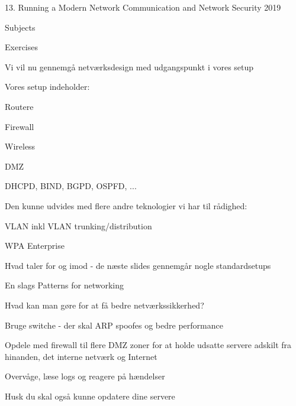 \documentclass[Screen16to9,17pt]{foils}
\begin{document}
\mytitlepage
{13. Running a Modern Network}
{Communication and Network Security 2019}



\begin{list1}
\item Subjects
\begin{list2}
\item
\end{list2}
\item Exercises
\begin{list2}
\item
\end{list2}
\end{list1}


\begin{list1}
\item Vi vil nu gennemgå netværksdesign med udgangspunkt i vores setup
\item Vores setup indeholder:
\begin{list2}
\item Routere
\item Firewall
\item Wireless
\item DMZ
\item DHCPD, BIND, BGPD, OSPFD, ...
\end{list2}
\item Den kunne udvides med flere andre teknologier vi har til rådighed:
\begin{list2}
\item VLAN inkl VLAN trunking/distribution
\item WPA Enterprise
\end{list2}
\item Hvad taler for og imod - de næste slides gennemgår nogle standardsetups
\item En slags Patterns for networking
\end{list1}






\begin{list1}
\item Hvad kan man gøre for at få bedre netværkssikkerhed?
\begin{list2}
\item Bruge switche - der skal ARP spoofes og bedre performance
\item Opdele med firewall til flere DMZ zoner for at holde
      udsatte servere adskilt fra hinanden, det interne netværk og
      Internet
\item Overvåge, læse logs og reagere på hændelser
\end{list2}
\item Husk du skal også kunne opdatere dine servere
\end{list1}
\end{document}

